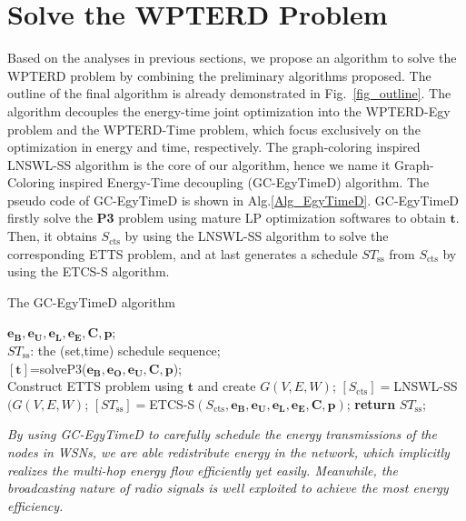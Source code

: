 \documentclass[journal,10pt]{IEEEtran}
\begin{document}
\section{Solve the WPTERD Problem}
\label{sec_algcombin}
Based on the analyses in previous sections, we propose an algorithm to solve the WPTERD problem by combining the preliminary algorithms proposed. The outline of the final algorithm is already demonstrated in Fig.~\ref{fig_outline}. The algorithm decouples the energy-time joint optimization into the WPTERD-Egy problem and the WPTERD-Time problem, which focus exclusively on the optimization in energy and time, respectively. The graph-coloring inspired LNSWL-SS algorithm is the core of our algorithm, hence we name it Graph-Coloring inspired Energy-Time decoupling (GC-EgyTimeD) algorithm. The pseudo code of GC-EgyTimeD is shown in Alg.\ref{Alg_EgyTimeD}.  GC-EgyTimeD firstly solve the \textbf{P3} problem using mature LP optimization softwares to obtain $\mathbf{t}$. Then, it obtains $S_\text{cts}$ by using the LNSWL-SS algorithm to solve the corresponding ETTS problem, and at last generates a schedule $ST_\text{ss}$ from $S_\text{cts}$ by using the ETCS-S algorithm.

\begin{algorithm}[!htb]
\caption{The GC-EgyTimeD algorithm}
\begin{algorithmic}[1]\label{Alg_EgyTimeD}
    \REQUIRE $\mathbf{e_B}, \mathbf{e_U}, \mathbf{e_L}, \mathbf{e_E}, \mathbf{C}, \mathbf{p}$;\\
    \ENSURE $ST_\text{ss}$: the (set,time) schedule sequence;\\
    \STATE $[\mathbf{t}]${=}solveP3($\mathbf{e_B}, \mathbf{e_O},\mathbf{e_U},\mathbf{C}, \mathbf{p}$);\\
    \STATE Construct ETTS problem using $\mathbf{t}$ and create $G(V,E,W)$;
    \STATE $[S_\text{cts}]{=}$LNSWL-SS$(G(V,E,W)$;
    \STATE $[ST_\text{ss}]{=}$ETCS-S$(S_\text{cts},\mathbf{e_B}, \mathbf{e_U}, \mathbf{e_L}, \mathbf{e_E}, \mathbf{C}, \mathbf{p})$;
    \STATE \textbf{return} $ST_\text{ss}$;
\end{algorithmic}
\end{algorithm}

\textit{By using GC-EgyTimeD to carefully schedule the energy transmissions of the nodes in WSNs, we are able redistribute energy in the network, which implicitly realizes the multi-hop energy flow efficiently yet easily. Meanwhile, the broadcasting nature of radio signals is well exploited to achieve the most energy efficiency.}
\end{document}
